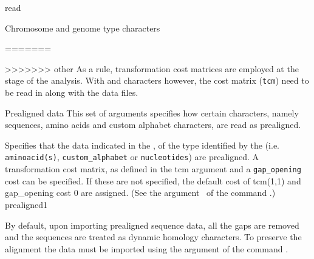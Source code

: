 \begin{command}{read}{}
\begin{arguments}
\begin{argumentgroup}{Chromosome and genome type characters}
\begin{argumentgroup}{Custom alphabet type characters}
<<<<<<< local
	}
	 {customalphabet}
	 
\end{argumentgroup}

            \begin{statement}
=======
        \begin{statement}
>>>>>>> other
            As a rule, transformation cost matrices are employed at the  stage of the
            analysis.  With  and  characters however, 
            the cost matrix (\texttt{tcm}) need to  be read in along with the data files.
        \end{statement}

        \begin{argumentgroup}{Prealigned data}
            This set of arguments specifies how certain characters, namely sequences,
            amino acids and custom alphabet characters, are read as prealigned.
    
                {Specifies that the data indicated in the \poystring, of the type identified by the \poylident (i.e. 
                \texttt{aminoacid(s)}, \texttt{custom\_alphabet} or \texttt{nucleotides}) are prealigned.
                A transformation cost matrix, as defined in the tcm \poystring argument and a \texttt{gap\_opening}
                cost can be specified.  If these are not specified, the default cost of tcm(1,1) and gap\_opening
                cost $ 0 $ are assigned. (See the argument~ 
                of the command .)}
                {prealigned1}
            
            \begin{statement}
                By default, upon importing prealigned sequence data, all the gaps are
                removed and the sequences are treated as dynamic homology characters.
                To preserve the alignment the data must be imported using the
                 argument of the command .
            \end{statement}
             

\end{argumentgroup}
\end{statement}
\end{argumentgroup}
\end{arguments}
\end{command}
